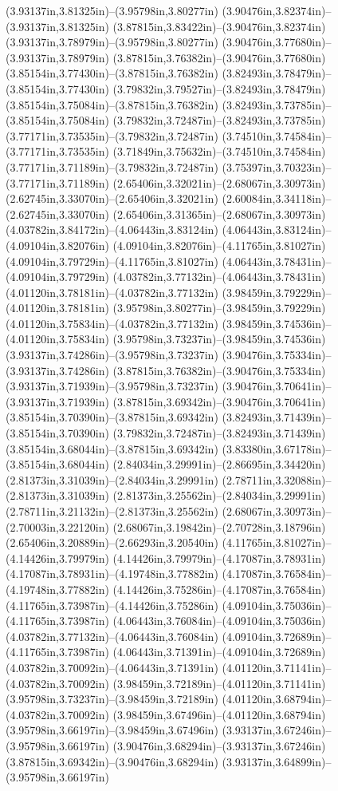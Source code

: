 (3.93137in,3.81325in)--(3.95798in,3.80277in) (3.90476in,3.82374in)--(3.93137in,3.81325in) (3.87815in,3.83422in)--(3.90476in,3.82374in) (3.93137in,3.78979in)--(3.95798in,3.80277in) (3.90476in,3.77680in)--(3.93137in,3.78979in) (3.87815in,3.76382in)--(3.90476in,3.77680in) (3.85154in,3.77430in)--(3.87815in,3.76382in) (3.82493in,3.78479in)--(3.85154in,3.77430in) (3.79832in,3.79527in)--(3.82493in,3.78479in) (3.85154in,3.75084in)--(3.87815in,3.76382in) (3.82493in,3.73785in)--(3.85154in,3.75084in) (3.79832in,3.72487in)--(3.82493in,3.73785in) (3.77171in,3.73535in)--(3.79832in,3.72487in) (3.74510in,3.74584in)--(3.77171in,3.73535in) (3.71849in,3.75632in)--(3.74510in,3.74584in) (3.77171in,3.71189in)--(3.79832in,3.72487in) (3.75397in,3.70323in)--(3.77171in,3.71189in) (2.65406in,3.32021in)--(2.68067in,3.30973in) (2.62745in,3.33070in)--(2.65406in,3.32021in) (2.60084in,3.34118in)--(2.62745in,3.33070in) (2.65406in,3.31365in)--(2.68067in,3.30973in) (4.03782in,3.84172in)--(4.06443in,3.83124in) (4.06443in,3.83124in)--(4.09104in,3.82076in) (4.09104in,3.82076in)--(4.11765in,3.81027in) (4.09104in,3.79729in)--(4.11765in,3.81027in) (4.06443in,3.78431in)--(4.09104in,3.79729in) (4.03782in,3.77132in)--(4.06443in,3.78431in) (4.01120in,3.78181in)--(4.03782in,3.77132in) (3.98459in,3.79229in)--(4.01120in,3.78181in) (3.95798in,3.80277in)--(3.98459in,3.79229in) (4.01120in,3.75834in)--(4.03782in,3.77132in) (3.98459in,3.74536in)--(4.01120in,3.75834in) (3.95798in,3.73237in)--(3.98459in,3.74536in) (3.93137in,3.74286in)--(3.95798in,3.73237in) (3.90476in,3.75334in)--(3.93137in,3.74286in) (3.87815in,3.76382in)--(3.90476in,3.75334in) (3.93137in,3.71939in)--(3.95798in,3.73237in) (3.90476in,3.70641in)--(3.93137in,3.71939in) (3.87815in,3.69342in)--(3.90476in,3.70641in) (3.85154in,3.70390in)--(3.87815in,3.69342in) (3.82493in,3.71439in)--(3.85154in,3.70390in) (3.79832in,3.72487in)--(3.82493in,3.71439in) (3.85154in,3.68044in)--(3.87815in,3.69342in) (3.83380in,3.67178in)--(3.85154in,3.68044in) (2.84034in,3.29991in)--(2.86695in,3.34420in) (2.81373in,3.31039in)--(2.84034in,3.29991in) (2.78711in,3.32088in)--(2.81373in,3.31039in) (2.81373in,3.25562in)--(2.84034in,3.29991in) (2.78711in,3.21132in)--(2.81373in,3.25562in) (2.68067in,3.30973in)--(2.70003in,3.22120in) (2.68067in,3.19842in)--(2.70728in,3.18796in) (2.65406in,3.20889in)--(2.66293in,3.20540in) (4.11765in,3.81027in)--(4.14426in,3.79979in) (4.14426in,3.79979in)--(4.17087in,3.78931in) (4.17087in,3.78931in)--(4.19748in,3.77882in) (4.17087in,3.76584in)--(4.19748in,3.77882in) (4.14426in,3.75286in)--(4.17087in,3.76584in) (4.11765in,3.73987in)--(4.14426in,3.75286in) (4.09104in,3.75036in)--(4.11765in,3.73987in) (4.06443in,3.76084in)--(4.09104in,3.75036in) (4.03782in,3.77132in)--(4.06443in,3.76084in) (4.09104in,3.72689in)--(4.11765in,3.73987in) (4.06443in,3.71391in)--(4.09104in,3.72689in) (4.03782in,3.70092in)--(4.06443in,3.71391in) (4.01120in,3.71141in)--(4.03782in,3.70092in) (3.98459in,3.72189in)--(4.01120in,3.71141in) (3.95798in,3.73237in)--(3.98459in,3.72189in) (4.01120in,3.68794in)--(4.03782in,3.70092in) (3.98459in,3.67496in)--(4.01120in,3.68794in) (3.95798in,3.66197in)--(3.98459in,3.67496in) (3.93137in,3.67246in)--(3.95798in,3.66197in) (3.90476in,3.68294in)--(3.93137in,3.67246in) (3.87815in,3.69342in)--(3.90476in,3.68294in) (3.93137in,3.64899in)--(3.95798in,3.66197in) 